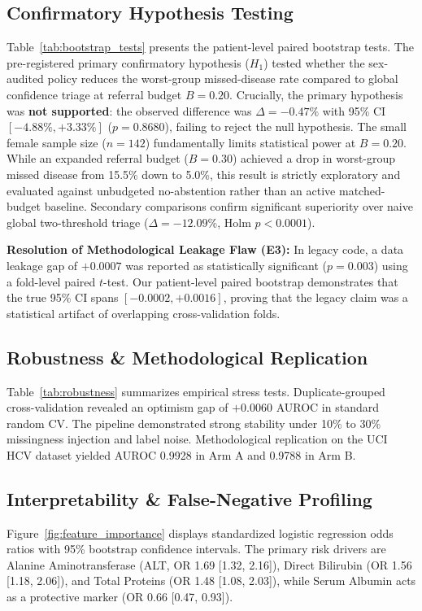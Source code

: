 \documentclass[11pt,a4paper]{article}
\begin{document}
\subsection{Confirmatory Hypothesis Testing}
Table~\ref{tab:bootstrap_tests} presents the patient-level paired bootstrap tests. 
The pre-registered primary confirmatory hypothesis ($H_1$) tested whether the sex-audited policy reduces the worst-group missed-disease rate compared to global confidence triage at referral budget $B=0.20$. Crucially, the primary hypothesis was \textbf{not supported}: the observed difference was $\Delta = -0.47\%$ with 95\% CI $[-4.88\%, +3.33\%]$ ($p=0.8680$), failing to reject the null hypothesis. The small female sample size ($n=142$) fundamentally limits statistical power at $B=0.20$. While an expanded referral budget ($B=0.30$) achieved a drop in worst-group missed disease from 15.5\% down to 5.0\%, this result is strictly exploratory and evaluated against unbudgeted no-abstention rather than an active matched-budget baseline. Secondary comparisons confirm significant superiority over naive global two-threshold triage ($\Delta = -12.09\%$, Holm $p < 0.0001$).



\noindent\textbf{Resolution of Methodological Leakage Flaw (E3):} In legacy code, a data leakage gap of $+0.0007$ was reported as statistically significant ($p=0.003$) using a fold-level paired $t$-test. Our patient-level paired bootstrap demonstrates that the true 95\% CI spans $[-0.0002, +0.0016]$, proving that the legacy claim was a statistical artifact of overlapping cross-validation folds.

\subsection{Robustness \& Methodological Replication}
\label{sec:robustness}
Table~\ref{tab:robustness} summarizes empirical stress tests. Duplicate-grouped cross-validation revealed an optimism gap of $+0.0060$ AUROC in standard random CV. The pipeline demonstrated strong stability under 10\% to 30\% missingness injection and label noise. Methodological replication on the UCI HCV dataset yielded AUROC 0.9928 in Arm A and 0.9788 in Arm B.



\subsection{Interpretability \& False-Negative Profiling}
Figure~\ref{fig:feature_importance} displays standardized logistic regression odds ratios with 95\% bootstrap confidence intervals. The primary risk drivers are Alanine Aminotransferase (ALT, OR 1.69 [1.32, 2.16]), Direct Bilirubin (OR 1.56 [1.18, 2.06]), and Total Proteins (OR 1.48 [1.08, 2.03]), while Serum Albumin acts as a protective marker (OR 0.66 [0.47, 0.93]).
\end{document}
